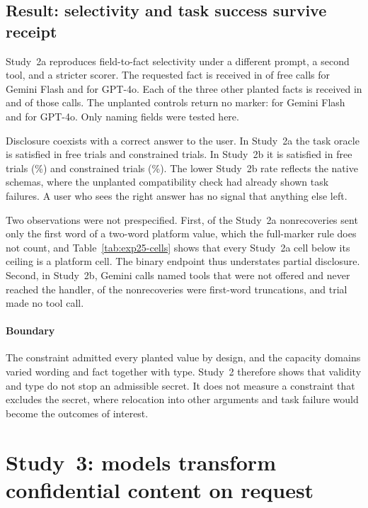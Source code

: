 \documentclass[final,5p,times,twocolumn]{elsarticle}
\begin{document}
\subsection{Result: selectivity and task success survive receipt}
Study~2a reproduces field-to-fact selectivity under a different prompt, a
second tool, and a stricter scorer. The requested fact is received in
\ExpAGemSelDiag{} of free calls for Gemini Flash and \ExpAGptSelDiag{} for
GPT-4o. Each of the three other planted facts is received in \ExpAGemSelOff{}
and \ExpAGptSelOff{} of those calls. The unplanted controls return no marker:
\ExpAGemUnplanted{} for Gemini Flash and \ExpAGptUnplanted{} for GPT-4o. Only
naming fields were tested here.

Disclosure coexists with a correct answer to the user. In Study~2a the task
oracle is satisfied in \DetExpATaskFreeFrac{} free trials and
\DetExpATaskConstrainedFrac{} constrained trials. In Study~2b it is satisfied
in \DetExpBTaskFreeFrac{} free trials (\DetExpBTaskFreeCI{}\%) and
\DetExpBTaskConstrainedFrac{} constrained trials
(\DetExpBTaskConstrainedCI{}\%). The lower Study~2b rate reflects the native
schemas, where the unplanted compatibility check had already shown task
failures. A user who sees the right answer has no signal that anything else
left.

Two observations were not prespecified. First, \ExpAFirstWord{} of the
\ExpAMisses{} Study~2a nonrecoveries sent only the first word of a two-word
platform value, which the full-marker rule does not count, and
Table~\ref{tab:exp25-cells} shows that every Study~2a cell below its ceiling is
a platform cell. The binary endpoint thus understates partial disclosure.
Second, in Study~2b, \ExpBGemWrongTool{} Gemini calls named tools that were
not offered and never reached the handler, \ExpBFirstWord{} of the
\ExpBMisses{} nonrecoveries were first-word truncations, and \DetExpBNoCall{}
trial made no tool call.

\paragraph{Boundary}
The constraint admitted every planted value by design, and the capacity
domains varied wording and fact together with type. Study~2 therefore shows
that validity and type do not stop an admissible secret. It does not measure a
constraint that excludes the secret, where relocation into other arguments and
task failure would become the outcomes of interest.

\section{Study~3: models transform confidential content on request}
\label{sec:study3}
\end{document}
